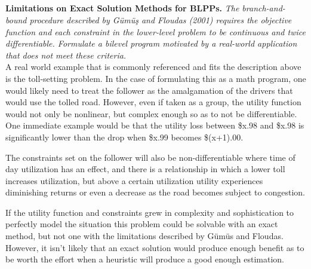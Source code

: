 \documentclass[12pt]{amsart}
\begin{document}
\subsection{}
\textbf{Limitations on Exact Solution Methods for BLPPs.} 
\textit{The branch-and-bound procedure described by Gümüş and Floudas (2001) requires the objective function and each constraint in the lower-level problem to be continuous and twice differentiable. Formulate a bilevel program motivated by a real-world application that does not meet these criteria.} \\

	A real world example that is commonly referenced and fits the description above is the toll-setting problem.
	In the case of formulating this as a math program, one would likely need to treat the follower as the amalgamation 
	of the drivers that would use the tolled road.
	However, even if taken as a group, the utility function would not only be nonlinear, but complex enough
	so as to not be differentiable.
	One immediate example would be that the utility loss between \$x.98 and \$x.98 is significantly lower than
	the drop when \$x.99 becomes \$(x+1).00. 
	
	The constraints set on the follower will also be non-differentiable where time of day utilization has an effect,
	and there is a relationship in which a lower toll increases utilization, but above a certain utilization utility
	experiences diminishing returns or even a decrease as the road becomes subject to congestion.
	
	If the utility function and constraints grew in complexity and sophistication to perfectly model the
	situation this problem could be solvable with an exact method, but not one with the limitations described
	by G{\"u}m{\"u}s and Floudas. However, it isn't likely that an exact solution would produce enough
	benefit as to be worth the effort when a heuristic will produce a good enough estimation.
\end{document}
